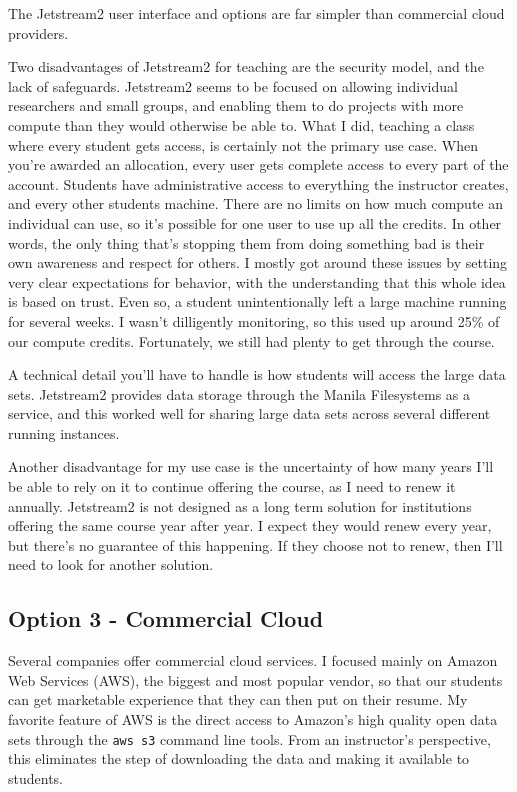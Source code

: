 \documentclass[12pt]{article}
\begin{document}
The Jetstream2 user interface and options are far simpler than commercial cloud providers.

Two disadvantages of Jetstream2 for teaching are the security model, and the lack of safeguards.
Jetstream2 seems to be focused on allowing individual researchers and small groups, and enabling them to do projects with more compute than they would otherwise be able to.
What I did, teaching a class where every student gets access, is certainly not the primary use case.
When you're awarded an allocation, every user gets complete access to every part of the account.
Students have administrative access to everything the instructor creates, and every other students machine.
There are no limits on how much compute an individual can use, so it's possible for one user to use up all the credits.
In other words, the only thing that's stopping them from doing something bad is their own awareness and respect for others.
I mostly got around these issues by setting very clear expectations for behavior, with the understanding that this whole idea is based on trust.
Even so, a student unintentionally left a large machine running for several weeks.
I wasn't dilligently monitoring, so this used up around 25\% of our compute credits.
Fortunately, we still had plenty to get through the course.

A technical detail you'll have to handle is how students will access the large data sets.
Jetstream2 provides data storage through the Manila Filesystems as a service, and this worked well for sharing large data sets across several different running instances.

Another disadvantage for my use case is the uncertainty of how many years I'll be able to rely on it to continue offering the course, as I need to renew it annually.
Jetstream2 is not designed as a long term solution for institutions offering the same course year after year. 
I expect they would renew every year, but there's no guarantee of this happening.
If they choose not to renew, then I'll need to look for another solution.

\subsection{Option 3 - Commercial Cloud}

Several companies offer commercial cloud services.
I focused mainly on Amazon Web Services (AWS), the biggest and most popular vendor, so that our students can get marketable experience that they can then put on their resume.
My favorite feature of AWS is the direct access to Amazon's high quality open data sets through the \texttt{aws s3} command line tools.
From an instructor's perspective, this eliminates the step of downloading the data and making it available to students.
\end{document}
